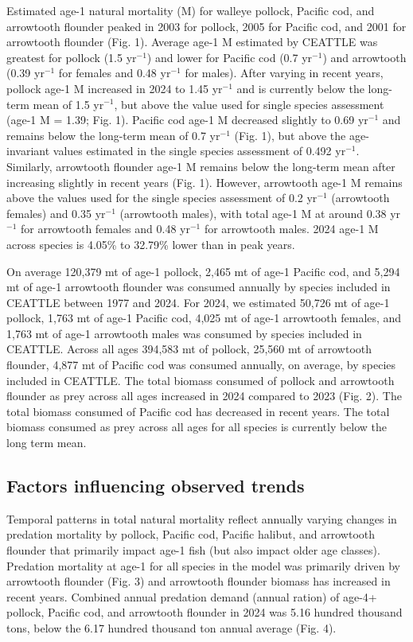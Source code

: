 \documentclass[
]{article}
\begin{document}
Estimated age-1 natural mortality (M) for walleye pollock, Pacific cod,
and arrowtooth flounder peaked in 2003 for pollock, 2005 for Pacific
cod, and 2001 for arrowtooth flounder (Fig. 1). Average age-1 M
estimated by CEATTLE was greatest for pollock (1.5 yr\(^{-1}\)) and
lower for Pacific cod (0.7 yr\(^{-1}\)) and arrowtooth (0.39 yr\(^{-1}\)
for females and 0.48 yr\(^{-1}\) for males). After varying in recent
years, pollock age-1 M increased in 2024 to 1.45 yr\(^{-1}\) and is
currently below the long-term mean of 1.5 yr\(^{-1}\), but above the
value used for single species assessment (age-1 M = 1.39; Fig. 1).
Pacific cod age-1 M decreased slightly to 0.69 yr\(^{-1}\) and remains
below the long-term mean of 0.7 yr\(^{-1}\) (Fig. 1), but above the
age-invariant values estimated in the single species assessment of 0.492
yr\(^{-1}\). Similarly, arrowtooth flounder age-1 M remains below the
long-term mean after increasing slightly in recent years (Fig. 1).
However, arrowtooth age-1 M remains above the values used for the single
species assessment of 0.2 yr\(^{-1}\) (arrowtooth females) and 0.35
yr\(^{-1}\) (arrowtooth males), with total age-1 M at around 0.38
yr\(^{-1}\) for arrowtooth females and 0.48 yr\(^{-1}\) for arrowtooth
males. 2024 age-1 M across species is 4.05\% to 32.79\% lower than in
peak years.

On average 120,379 mt of age-1 pollock, 2,465 mt of age-1 Pacific cod,
and 5,294 mt of age-1 arrowtooth flounder was consumed annually by
species included in CEATTLE between 1977 and 2024. For 2024, we
estimated 50,726 mt of age-1 pollock, 1,763 mt of age-1 Pacific cod,
4,025 mt of age-1 arrowtooth females, and 1,763 mt of age-1 arrowtooth
males was consumed by species included in CEATTLE. Across all ages
394,583 mt of pollock, 25,560 mt of arrowtooth flounder, 4,877 mt of
Pacific cod was consumed annually, on average, by species included in
CEATTLE. The total biomass consumed of pollock and arrowtooth flounder
as prey across all ages increased in 2024 compared to 2023 (Fig. 2). The
total biomass consumed of Pacific cod has decreased in recent years. The
total biomass consumed as prey across all ages for all species is
currently below the long term mean.

\subsection{Factors influencing observed
trends}\label{factors-influencing-observed-trends}

Temporal patterns in total natural mortality reflect annually varying
changes in predation mortality by pollock, Pacific cod, Pacific halibut,
and arrowtooth flounder that primarily impact age-1 fish (but also
impact older age classes). Predation mortality at age-1 for all species
in the model was primarily driven by arrowtooth flounder (Fig. 3) and
arrowtooth flounder biomass has increased in recent years. Combined
annual predation demand (annual ration) of age-4+ pollock, Pacific cod,
and arrowtooth flounder in 2024 was 5.16 hundred thousand tons, below
the 6.17 hundred thousand ton annual average (Fig. 4).
\end{document}
